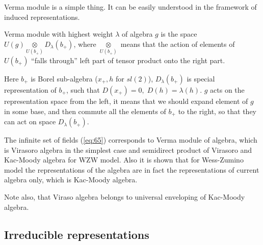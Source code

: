 \documentclass[a4paper,12pt]{article}
\theoremstyle{definition} \newtheorem{Def}{Definition}
\begin{document}
Verma module is a simple thing. It can be easily understood in the framework of induced representations. 

Verma module with highest weight $\lambda$ of algebra $g$ is the space $U(g)\underset{U(b_{+})}{\otimes} D_{\lambda}(b_{+})$, where $\underset{U(b_{+})}{\otimes}$ means that the action of elements of $U(b_{+})$ ``falls through'' left part of tensor product onto the right part.

Here $b_{+}$ is Borel sub-algebra ($x_{+},h$ for $sl(2)$), $D_{\lambda}(b_{+})$ is special representation of $b_{+}$, such that $D(x_{+})=0,\; D(h)=\lambda(h)$.
$g$ acts on the representation space from the left, it means that we should expand element of $g$ in some base, and then commute all the elements of $b_{+}$ to the right, so that they can act on space $D_{\lambda}(b_{+})$.



The infinite set of fields (\ref{eq:65}) corresponds to Verma module of algebra, which is Virasoro algebra in the simplest case and semidirect product of Virasoro and Kac-Moody algebra for WZW model. Also it is shown that for Wess-Zumino model the representations of the algebra are in fact the representations of current algebra only, which is Kac-Moody algebra.

Note also, that Viraso algebra belongs to universal enveloping of Kac-Moody algebra.

\subsection{Irreducible representations}
\label{sec:irred-repr}


{}

\end{document}

